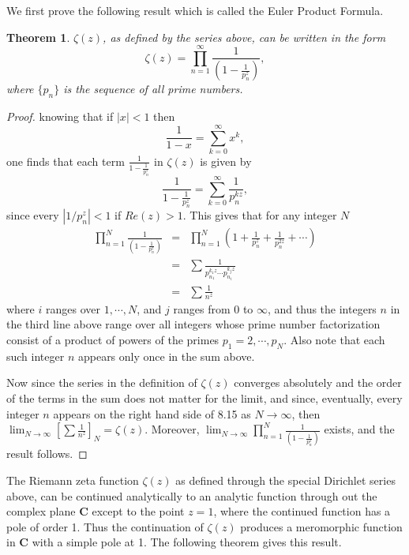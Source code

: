 \documentclass[12pt,letterpaper]{book}
\newtheorem{theorem}{Theorem}
\begin{document}
We first prove the following result which is called the Euler
Product Formula.

\begin{theorem}
$\zeta(z)$, as defined by the series above, can be written in the form
\begin{equation}
\zeta(z)=\prod_{n=1}^{\infty}\frac{1}{\left(1-\frac{1}{p_n^z}\right)},
\end{equation}
where $\{p_n\}$ is the sequence of all prime numbers.
\end{theorem}

\begin{proof}
knowing that if $|x|<1$ then
\begin{equation}
\frac{1}{1-x}=\sum_{k=0}^{\infty}x^k,
\end{equation}
one finds that each term $\frac{1}{1-\frac{1}{p_n^z}}$ in $\zeta(z)$ is given by
\begin{equation}
\frac{1}{1-\frac{1}{p_n^z}}=\sum_{k=0}^{\infty}\frac{1}{p_n^{kz}},
\end{equation}
since every $|1/p_n^z|<1$ if $Re(z)>1$. This gives that for any integer $N$
\begin{eqnarray}
\prod_{n=1}^N\frac{1}{\left(1-\frac{1}{p_n^z}\right)}&=&\prod_{n=1}^N\left(1+
\frac{1}{p_n^z}+\frac{1}{p_n^{2z}}+\cdots\right)\nonumber\\&=&\sum\frac{1}{p_
{n_1}^{k_1z}\cdots p_{n_i}^{k_jz}}\\&=&\sum\frac{1}{n^z}\nonumber
\end{eqnarray}
where $i$ ranges over $1,\cdots,N$, and $j$ ranges from $0$ to
$\infty$, and thus the integers $n$ in the third line above range
over all integers whose prime number factorization consist of a
product of powers of the primes $p_1=2,\cdots, p_N$. Also note that
each such integer $n$ appears only once in the sum above.

Now since the series in the definition of $\zeta(z)$ converges
absolutely and the order of the terms in the sum does not matter for
the limit, and since, eventually, every integer $n$ appears on the
right hand side of 8.15 as $N\longrightarrow\infty$, then
$\lim_{N\to\infty}\left[\sum\frac{1}{n^z}\nonumber\right]_N=\zeta(z)$.
Moreover,
$\lim_{N\to\infty}\prod_{n=1}^N\frac{1}{\left(1-\frac{1}{p_n^z}\right)}$
exists, and the result follows.
\end{proof}

The Riemann zeta function $\zeta(z)$ as defined through the special
Dirichlet series above,  can be continued analytically to an
analytic function through out the complex plane {\bf C} except to
the point $z=1$, where the continued function has a pole of order 1.
Thus the continuation of $\zeta(z)$ produces a meromorphic function
in {\bf C} with a simple pole at 1. The following theorem gives this
result.
\end{document}
